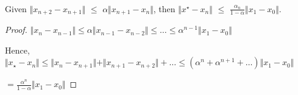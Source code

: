 \documentclass[12pt]{article}
\newenvironment{problem}[2][Problem]{\begin{trivlist}
\item[\hskip \labelsep {\bfseries #1}\hskip \labelsep {\bfseries #2.}]}{\end{trivlist}}
\begin{document}
\begin{problem}{3}
\text{ }\\
Given $\Vert x_{n+2} - x_{n+1} \Vert$  $\leqslant$ $\alpha\Vert x_{n+1} - x_{n} \Vert$, then $\Vert x^{\star} - x_{n} \Vert$ $\leqslant$ $\frac{\alpha_{n}}{1-\alpha}\Vert x_{1} - x_{0}\Vert$.
\end{problem}
 
\begin{proof}
$\Vert x_{n} - x_{n - 1} \Vert\leqslant\alpha\Vert x_{n - 1} - x_{n - 2} \Vert\leqslant\dots\leqslant\alpha^{n-1}\Vert x_{1} - x_{0}\Vert$ \\
\par Hence, $\Vert x_{\star} - x_{n} \Vert\leqslant\Vert x_{n} - x_{n+1} \Vert+\Vert x_{n+1} - x_{n+2}\Vert + \dots\leqslant(\alpha^{n}+\alpha^{n+1}+\dots)\Vert x_{1} - x_{0}\Vert$ \\
\par$= \frac{\alpha^{n}}{1-\alpha}\Vert x_{1} - x_{0}\Vert$
\end{proof}
\end{document}
